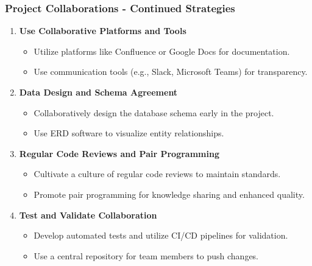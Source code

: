 \documentclass[aspectratio=169]{beamer}
\begin{document}
\begin{frame}[fragile]
    \frametitle{Project Collaborations - Continued Strategies}
    \begin{enumerate}[resume]
        \item \textbf{Use Collaborative Platforms and Tools}
        \begin{itemize}
            \item Utilize platforms like Confluence or Google Docs for documentation.
            \item Use communication tools (e.g., Slack, Microsoft Teams) for transparency.
        \end{itemize}

        \item \textbf{Data Design and Schema Agreement}
        \begin{itemize}
            \item Collaboratively design the database schema early in the project.
            \item Use ERD software to visualize entity relationships.
        \end{itemize}

        \item \textbf{Regular Code Reviews and Pair Programming}
        \begin{itemize}
            \item Cultivate a culture of regular code reviews to maintain standards.
            \item Promote pair programming for knowledge sharing and enhanced quality.
        \end{itemize}

        \item \textbf{Test and Validate Collaboration}
        \begin{itemize}
            \item Develop automated tests and utilize CI/CD pipelines for validation.
            \item Use a central repository for team members to push changes.
        \end{itemize}
    \end{enumerate}
\end{frame}
\end{document}
